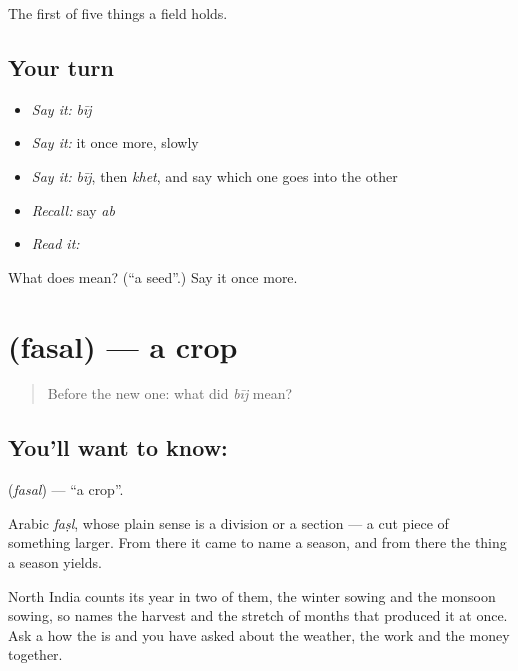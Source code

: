 \begin{grammarlens}[title={What you've built}]
The first of five things a field holds.
\end{grammarlens}

\subsection*{Your turn}
\begin{itemize}
\raggedright
  \item \emph{Say it:} \emph{bīj}
  \item \emph{Say it:} it once more, slowly
  \item \emph{Say it:} \emph{bīj}, then \emph{khet}, and say which one goes into the other
  \item \emph{Recall:} say \emph{ab}
  \item \emph{Read it:} \textbf{}
\end{itemize}

\begin{tcolorbox}[breakable,colback=teal!4,colframe=teal!35!black,title={Before you move on}]
What does  mean? (\textquotedblleft{}a seed\textquotedblright{}.) Say it once more.
\end{tcolorbox}
\section[\texorpdfstring{\hi{फ़सल} (fasal)}{फ़सल (fasal)}]{ (fasal) — a crop}

\label{lesson:HI-C66-crop}



\begin{quote}
Before the new one: what did \emph{bīj} mean?
\end{quote}

\subsection*{You'll want to know: }
\textbf{} (\emph{fasal}) — \textquotedblleft{}a crop\textquotedblright{}.

Arabic \emph{faṣl}, whose plain sense is a division or a section — a cut piece of something larger. From there it came to name a season, and from there the thing a season yields.

North India counts its year in two of them, the winter sowing and the monsoon sowing, so  names the harvest and the stretch of months that produced it at once. Ask a  how the  is and you have asked about the weather, the work and the money together.

